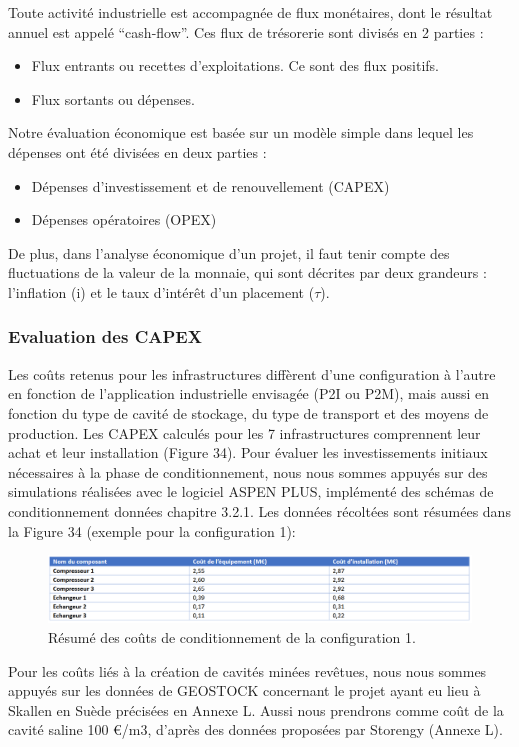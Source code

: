 \documentclass[11pt,french,a4paper]{article}
\begin{document}
Toute activité industrielle est accompagnée de flux monétaires, dont le résultat annuel est appelé “cash-flow”. Ces flux de trésorerie sont divisés en 2 parties : 
\begin{itemize}
\item Flux entrants ou recettes d’exploitations. Ce sont des flux positifs.
\item Flux sortants ou dépenses.
\end{itemize}
Notre évaluation économique est basée sur un modèle simple dans lequel les dépenses ont été divisées en deux parties : 
\begin{itemize}
\item Dépenses d'investissement et de renouvellement (CAPEX)
\item Dépenses opératoires (OPEX)
\end{itemize}
De plus, dans l'analyse économique d'un projet, il faut tenir compte des fluctuations de la valeur de la monnaie, qui sont décrites par deux grandeurs : l'inflation (i) et le taux d'intérêt d'un placement ($\tau$). 

\subsubsection{Evaluation des CAPEX}
Les coûts retenus pour les infrastructures diffèrent d'une configuration à l'autre en fonction de l'application industrielle envisagée (P2I ou P2M), mais aussi en fonction du type de cavité de stockage, du type de transport et des moyens de production.  Les CAPEX calculés pour les 7 infrastructures comprennent leur achat et leur installation (Figure 34).  
Pour évaluer les investissements initiaux nécessaires à la phase de conditionnement, nous nous sommes appuyés sur des simulations réalisées avec le logiciel ASPEN PLUS, implémenté des schémas de conditionnement données chapitre 3.2.1. Les données récoltées sont résumées dans la Figure 34 (exemple pour la configuration 1):

\begin{figure}[h!]
\centering
\includegraphics[width=0.9\linewidth]{image/chap5/Tableau 1 chap 5.png}
\caption{Résumé des coûts de conditionnement de la configuration 1. }
\end{figure}

Pour les coûts liés à la création de cavités minées revêtues, nous nous sommes appuyés sur les données de GEOSTOCK concernant le projet ayant eu lieu à Skallen en Suède précisées en Annexe L. Aussi nous prendrons comme coût de la cavité saline 100 €/m3, d’après des données proposées par Storengy (Annexe L). 
\end{document}
